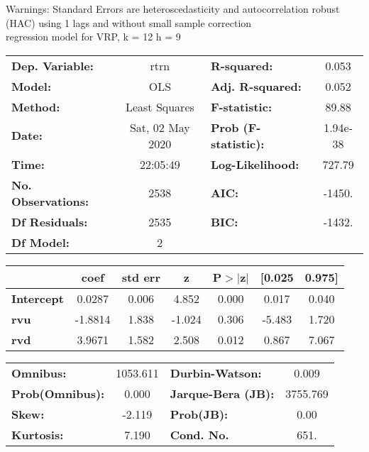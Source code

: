Warnings: \newline
 [1] Standard Errors are heteroscedasticity and autocorrelation robust (HAC) using 1 lags and without small sample correction\\ 

regression model for VRP, k = 12 h = 9\begin{center}
\begin{tabular}{lclc}
\toprule
\textbf{Dep. Variable:}    &       rtrn       & \textbf{  R-squared:         } &     0.053   \\
\textbf{Model:}            &       OLS        & \textbf{  Adj. R-squared:    } &     0.052   \\
\textbf{Method:}           &  Least Squares   & \textbf{  F-statistic:       } &     89.88   \\
\textbf{Date:}             & Sat, 02 May 2020 & \textbf{  Prob (F-statistic):} &  1.94e-38   \\
\textbf{Time:}             &     22:05:49     & \textbf{  Log-Likelihood:    } &    727.79   \\
\textbf{No. Observations:} &        2538      & \textbf{  AIC:               } &    -1450.   \\
\textbf{Df Residuals:}     &        2535      & \textbf{  BIC:               } &    -1432.   \\
\textbf{Df Model:}         &           2      & \textbf{                     } &             \\
\bottomrule
\end{tabular}
\begin{tabular}{lcccccc}
                   & \textbf{coef} & \textbf{std err} & \textbf{z} & \textbf{P$> |$z$|$} & \textbf{[0.025} & \textbf{0.975]}  \\
\midrule
\textbf{Intercept} &       0.0287  &        0.006     &     4.852  &         0.000        &        0.017    &        0.040     \\
\textbf{rvu}       &      -1.8814  &        1.838     &    -1.024  &         0.306        &       -5.483    &        1.720     \\
\textbf{rvd}       &       3.9671  &        1.582     &     2.508  &         0.012        &        0.867    &        7.067     \\
\bottomrule
\end{tabular}
\begin{tabular}{lclc}
\textbf{Omnibus:}       & 1053.611 & \textbf{  Durbin-Watson:     } &    0.009  \\
\textbf{Prob(Omnibus):} &   0.000  & \textbf{  Jarque-Bera (JB):  } & 3755.769  \\
\textbf{Skew:}          &  -2.119  & \textbf{  Prob(JB):          } &     0.00  \\
\textbf{Kurtosis:}      &   7.190  & \textbf{  Cond. No.          } &     651.  \\
\bottomrule
\end{tabular}
\end{center}


